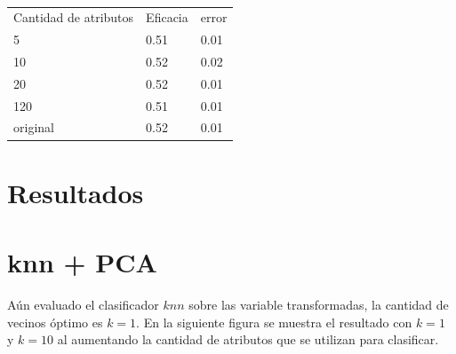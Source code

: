 \documentclass[a4paper,10pt]{article}
\begin{document}
\begin{table}
\centering
\caption{}
\label{table:NB}
\begin{tabular}{lll}
Cantidad de atributos & Eficacia & error \\
5 & 0.51 & 0.01 \\
10 & 0.52 & 0.02 \\
20 & 0.52 & 0.01 \\
120 & 0.51 & 0.01 \\
original & 0.52 & 0.01 \\
\end{tabular}
\end{table}

\section{Resultados}


\section{knn + PCA}

A\'un evaluado el clasificador $knn$ sobre las variable transformadas, la cantidad de vecinos \'optimo es $k=1$. En la siguiente figura se muestra el resultado con $k=1$ y $k=10$ al aumentando la cantidad de atributos que se utilizan para clasificar.  
\end{document}
